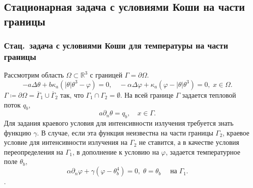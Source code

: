 \subsection{Стационарная задача с условиями Коши на части границы}\label{subsec:st-koshi}
\begin{frame}
    \frametitle{Стац.\ задача с условиями Коши для температуры на части границы}
    Рассмотрим область $\Omega\subset \mathbb{R}^3$ с границей $\Gamma=\partial\Omega$.
    \begin{equation}
        \label{eq:2_4:eq1}
        - a\Delta\theta + b\kappa_a(|\theta|\theta^3- \varphi)=0,   \quad
        -\alpha \Delta \varphi + \kappa_a(\varphi-|\theta|\theta^3)=0,\; x\in\Omega.
    \end{equation}
    $\Gamma \coloneqq \partial \Omega =\overline{\Gamma}_1 \cup \overline{\Gamma}_2$
    так, что $\Gamma_1 \cap \Gamma_2 =  \emptyset$.
    На всей границе $\Gamma$ задается тепловой поток $q_b$,
    \begin{equation}
        \label{eq:2_4:bc1}
        a\partial_n\theta = q_b, \quad x\in \Gamma.
    \end{equation}
    Для задания краевого условия для интенсивности излучения требуется знать функцию $\gamma$.
    В случае, если эта функция неизвестна на части границы $\Gamma_2$,
    краевое условие для интенсивности излучения на $\Gamma_2$ не ставится, а в качестве условия
    переопределения на $\Gamma_1$, в дополнение к условию на
    $\varphi$, задается температурное поле $\theta_b$,
    \begin{equation}
        \label{eq:2_4:bc2}
        \alpha\partial_n\varphi + \gamma (\varphi - \theta_b ^4 ) = 0,\;
        \theta=\theta_b\quad \text{ на } \Gamma_1.
    \end{equation}.

\end{frame}


